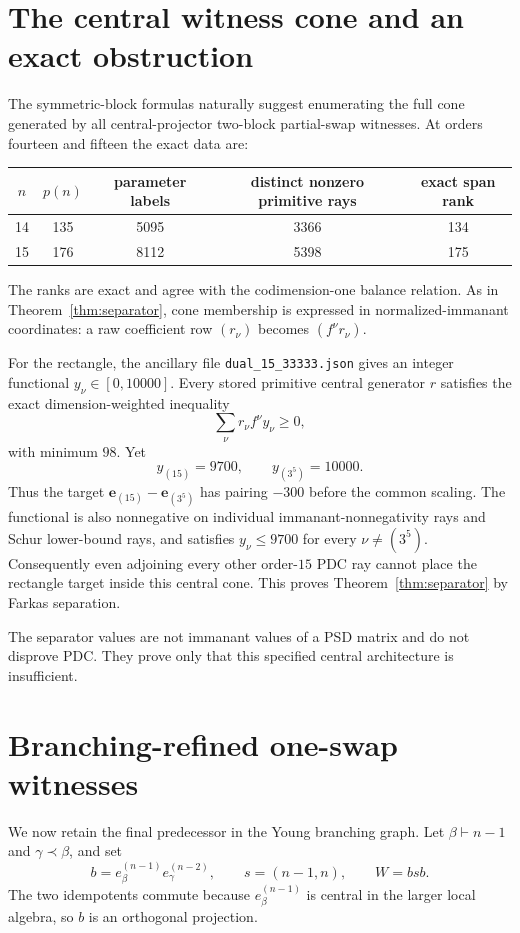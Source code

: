 \documentclass[11pt]{article}
\theoremstyle{definition}
\newcommand{\youngcovered}{\prec}
\begin{document}
\section{The central witness cone and an exact obstruction}\label{sec:cone}
The symmetric-block formulas naturally suggest enumerating the full cone generated by all central-projector two-block partial-swap witnesses.  At orders fourteen and fifteen the exact data are:
\begin{center}
\begin{tabular}{ccccc}
\toprule
$n$ & $p(n)$ & parameter labels & distinct nonzero primitive rays & exact span rank\\
\midrule
14 & 135 & 5095 & 3366 & 134\\
15 & 176 & 8112 & 5398 & 175\\
\bottomrule
\end{tabular}
\end{center}
The ranks are exact and agree with the codimension-one balance relation.  As in Theorem~\ref{thm:separator}, cone membership is expressed in normalized-immanant coordinates: a raw coefficient row $(r_\nu)$ becomes $(f^\nu r_\nu)$.

For the rectangle, the ancillary file \texttt{dual\_15\_33333.json} gives an integer functional $y_\nu\in[0,10000]$.  Every stored primitive central generator $r$ satisfies the exact dimension-weighted inequality
\[
 \sum_\nu r_\nu f^\nu y_\nu\ge0,
\]
with minimum $98$.  Yet
\[
 y_{(15)}=9700,\qquad y_{(3^5)}=10000.
\]
Thus the target $\mathbf e_{(15)}-\mathbf e_{(3^5)}$ has pairing $-300$ before the common scaling.  The functional is also nonnegative on individual immanant-nonnegativity rays and Schur lower-bound rays, and satisfies $y_\nu\le9700$ for every $\nu\ne(3^5)$.  Consequently even adjoining every other order-$15$ PDC ray cannot place the rectangle target inside this central cone.  This proves Theorem~\ref{thm:separator} by Farkas separation.

The separator values are not immanant values of a PSD matrix and do not disprove PDC.  They prove only that this specified central architecture is insufficient.

\section{Branching-refined one-swap witnesses}\label{sec:branching}
We now retain the final predecessor in the Young branching graph.  Let $\beta\vdash n-1$ and $\gamma\youngcovered\beta$, and set
\[
 b=e_\beta^{(n-1)}e_\gamma^{(n-2)},\qquad s=(n-1,n),\qquad W=bsb.
\]
The two idempotents commute because $e_\beta^{(n-1)}$ is central in the larger local algebra, so $b$ is an orthogonal projection.
\end{document}
